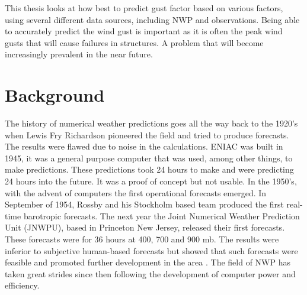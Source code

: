 This thesis looks at how best to predict gust factor based on various factors, using several different data sources, including NWP and observations. Being able to accurately predict the wind gust is important as it is often the peak wind gusts that will cause failures in structures. A problem that will become increasingly prevalent in the near future\cite{nasa_extreme_weather}.

\section{Background}
The history of numerical weather predictions goes all the way back to the 1920's when Lewis Fry Richardson pioneered the field and tried to produce forecasts. The results were flawed due to noise in the calculations. ENIAC was built in 1945, it was a general purpose computer that was used, among other things, to make predictions. These predictions took 24 hours to make and were predicting 24 hours into the future. It was a proof of concept but not usable\cite{TheENIACForecastsARecreation}. In the 1950's, with the advent of computers the first operational forecasts emerged. In September of 1954, Rossby and his Stockholm based team produced the first real-time barotropic forecasts. The next year the Joint Numerical Weather Prediction Unit (JNWPU), based in Princeton New Jersey, released their first forecasts. These forecasts were for 36 hours at 400, 700 and 900 mb. The results were inferior to subjective human-based forecasts but showed that such forecasts were feasible and promoted further development in the area \cite{historyNWP}. The field of NWP has taken great strides since then following the development of computer power and efficiency.


